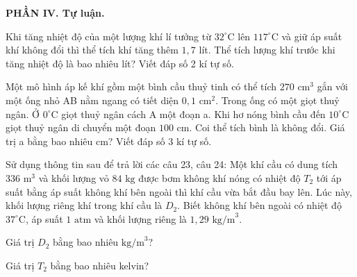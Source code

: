 \documentclass[12pt,a4paper,oneside]{article}
\begin{document}
\noindent\textbf{PHẦN IV. Tự luận.}
\setcounter{ex}{0}

\begin{ex}
	Khi tăng nhiệt độ của một lượng khí lí tưởng từ $32^\circ\text{C}$ lên $117^\circ\text{C}$ và giữ áp suất khí không đổi thì thể tích khí tăng thêm $1{,}7$ lít. Thể tích lượng khí trước khi tăng nhiệt độ là bao nhiêu lít? Viết đáp số 2 kí tự số.
\end{ex}

\begin{ex}
	Một mô hình áp kế khí gồm một bình cầu thuỷ tinh có thể tích $270 \text{ cm}^3$ gắn với một ống nhỏ AB nằm ngang có tiết diện $0{,}1 \text{ cm}^2$. Trong ống có một giọt thuỷ ngân. Ở $0^\circ\text{C}$ giọt thuỷ ngân cách A một đoạn a. Khi hơ nóng bình cầu đến $10^\circ\text{C}$ giọt thuỷ ngân di chuyển một đoạn $100 \text{ cm}$. Coi thể tích bình là không đổi. Giá trị a bằng bao nhiêu cm? Viết đáp số 3 kí tự số.
\end{ex}
\begin{ex}
	Sử dụng thông tin sau để trả lời các câu 23, câu 24: Một khí cầu có dung tích $336 \text{ m}^3$ và khối lượng vỏ $84 \text{ kg}$ được bơm không khí nóng có nhiệt độ $T_2$ tới áp suất bằng áp suất không khí bên ngoài thì khí cầu vừa bắt đầu bay lên. Lúc này, khối lượng riêng khí trong khí cầu là $D_2$. Biết không khí bên ngoài có nhiệt độ $37^\circ\text{C}$, áp suất $1 \text{ atm}$ và khối lượng riêng là $1{,}29 \text{ kg/m}^3$.
	\begin{listEX}
		\item Giá trị $D_2$ bằng bao nhiêu $\text{kg/m}^3$? 
		\item Giá trị $T_2$ bằng bao nhiêu kelvin?	
	\end{listEX}
\end{ex}
\end{document}
